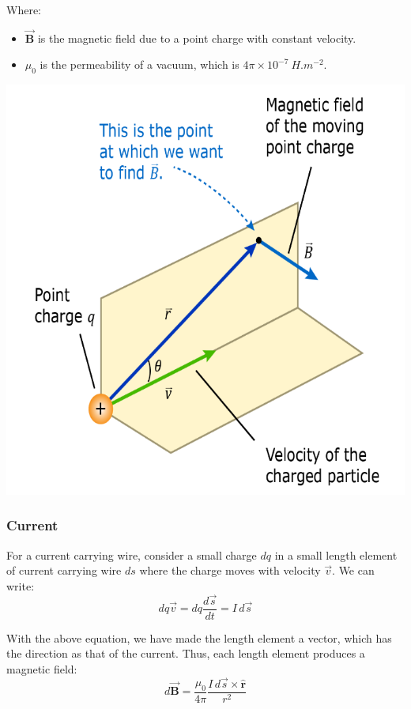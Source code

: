 \documentclass[11pt]{article}
\begin{document}
Where:
\begin{itemize}
\item \(\vec{\boldsymbol{B}}\) is the magnetic field due to a point charge with constant velocity.
\item \(\mu_0\) is the permeability of a vacuum, which is \(4 \pi \times 10^{-7} \ \unit{H.m^{-2}}\).
\end{itemize}

\begin{center}
\includegraphics[scale=0.55]{./images/biot-savart-law-moving-charge.png}
\end{center}

\subsubsection{Current}
\label{sec:org82416c1}
For a current carrying wire, consider a small charge \(dq\) in a small length element of current carrying wire \(ds\) where the charge moves with velocity \(\vec{v}\). We can write:
\[dq \vec{v} = dq \frac{d \vec{s}}{dt} = I \, d \vec{s}\]

With the above equation, we have made the length element a vector, which has the direction as that of the current. Thus, each length element produces a magnetic field:
\[d \vec{\boldsymbol{B}} = \frac{\mu_0}{4\pi} \frac{I \, d \vec{s} \times \hat{\boldsymbol{r}}}{r^2}\]
\end{document}
